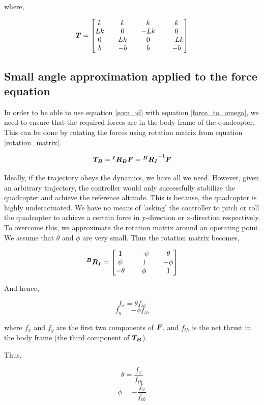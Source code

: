\documentclass[12pt,fleqn]{article}
\newcommand{\mbm}[1]{\mbox{\boldmath $#1$}}
\begin{document}
where, 

$$ \mbm{T} = \begin{bmatrix}
k && k && k && k \\ 
Lk && 0 && -Lk && 0 \\
0 && Lk && 0 && -Lk \\
b && -b && b && -b \end{bmatrix} $$

\subsection{Small angle approximation applied to the force equation}

In order to be able to use equation \ref{eom_id} with equation
\ref{force_to_omega}, we need to ensure that the required forces are
in the body frame of the quadcopter. This can be done by rotating the
forces using rotation matrix from equation
\ref{rotation_matrix}. 

$$ \mbm{T_B} = \mbm{^IR_B} \mbm{F} = \mbm{^BR_I}^{-1} \mbm{F} $$

Ideally, if the trajectory obeys the dynamics, we have all we
need. However, given an arbitrary trajectory, the controller would
only successfully stabilize the quadcopter and achieve the reference
altitude. This is because, the quadcoptor is highly underactuated. We
have no means of 'asking' the controller to pitch or roll the quadcopter to
achieve a certain force in y-direction or x-direction
respectively.\\

To overcome this, we approximate the rotation matrix
around an operating point. We assume that $\theta$ and
$\phi$ are very small. Thus the rotation matrix becomes,

$$  \mbm{^BR_I} = \begin{bmatrix} 1 && -\psi && \theta \\ \psi && 1 && -\phi \\
  -\theta && \phi && 1 \end{bmatrix} $$

And hence, 

$$ f_x  = \theta f_{th} $$
$$ f_y = -\phi f_{th} $$

where $f_x$ and $f_y$ are the first two components of $\mbm{F}$, and
$f_{th}$ is the net thrust in the body frame (the third component of
$\mbm{T_B}$).

Thus, 

$$ \theta = \frac{f_x}{f_{th}} $$
$$ \phi = -\frac{f_y}{f_{th}} $$
\end{document}

